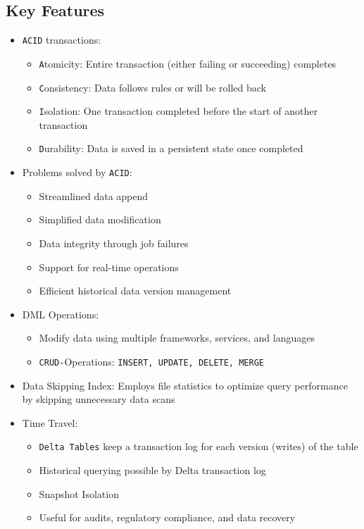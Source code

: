 \documentclass[11pt]{scrartcl}
\begin{document}
\subsection{Key Features}
\begin{itemize}
	\item \texttt{ACID} transactions:
	\begin{itemize}
		\item \texttt{A}tomicity: Entire transaction (either failing or succeeding) completes
		\item \texttt{C}onsistency: Data follows rules or will be rolled back
		\item \texttt{I}solation: One transaction completed before the start of another transaction
		\item \texttt{D}urability: Data is saved in a persistent state once completed
	\end{itemize}
	\item Problems solved by \texttt{ACID}:
	\begin{itemize}
		\item Streamlined data append
		\item Simplified data modification
		\item Data integrity through job failures
		\item Support for real-time operations
		\item Efficient historical data version management
	\end{itemize}
	\item DML Operations:
	\begin{itemize}
		\item Modify data using multiple frameworks, services, and languages
		\item \texttt{CRUD-}Operations: \texttt{INSERT, UPDATE, DELETE, MERGE}
	\end{itemize}
	\item Data Skipping Index: Employs file statistics to optimize query performance by skipping unnecessary data scans
	\item Time Travel:
	\begin{itemize}
		\item \texttt{Delta Tables} keep a transaction log for each version (writes) of the table
		\item Historical querying possible by Delta transaction log
		\item Snapshot Isolation
		\item Useful for audits, regulatory compliance, and data recovery

\end{itemize}
\end{itemize}
\end{document}

